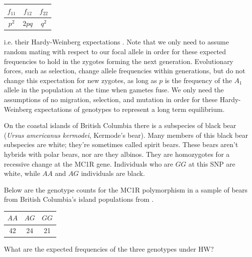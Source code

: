 {{

\begin{center}
\begin{tabular}{ccc}
\hline
$f_{11}$ & $f_{12}$ & $f_{22}$ \\
\hline
$p^2$ & $2pq$ & $q^2$ \\
\end{tabular}
\end{center}
i.e. their Hardy-Weinberg expectations \citep{hardy1908mendelian,weinberg1908ber}.
Note that we only need to assume random mating with respect to our
focal allele in order for these expected frequencies to hold in the
zygotes forming the next generation. Evolutionary forces, such as
selection, change allele frequencies within generations, but do not
change this expectation for new zygotes, as long as $p$ is the
frequency of the $A_1$ allele in the population at the time when
gametes fuse. We only need the assumptions of no migration, selection,
and mutation in order for these Hardy-Weinberg expectations of
genotypes to represent a long term equilibrium.


\begin{question}{}
On the coastal islands of British Columbia there is a subspecies of
black bear (\textit{Ursus americanus kermodei}, Kermode's bear). Many members of this
black bear subspecies are white; they're sometimes called spirit bears. These
bears aren't hybrids with polar bears, nor are they albinos. They are
homozygotes for a recessive change at the MC1R gene. Individuals who
are $GG$ at this SNP are white, while $AA$ and $AG$ individuals are black.

Below are the genotype counts for the MC1R polymorphism in a
sample of bears from British Columbia's island populations from \citet{RITLAND:01}.
\begin{center}
\begin{tabular}{ccc}
\hline
$AA$ & $AG$ & $GG$ \\
\hline
42 & 24 & 21\\
\end{tabular}
\end{center}
What are the expected frequencies of the three genotypes under HW?
\end{question}

}}
